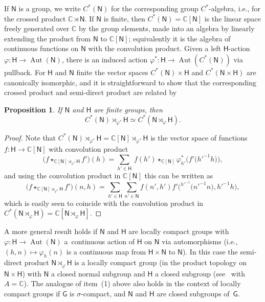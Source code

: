 \documentclass[11pt]{article}
\numberwithin{equation}{section}
\numberwithin{equation}{section}
\newcommand{\sfG}{\mathsf{G}}
\newcommand{\sfH}{\mathsf{H}}
\newcommand{\sfN}{\mathsf{N}}
\newcommand{\Aut}{\operatorname{Aut}}
\newcommand{\complex}{{\mathbb C}} %
\newtheorem{Proposition}[Theorem]{Proposition}
 { \theoremstyle{definition}
\newtheorem{Definition}[Theorem]{Definition}
\newtheorem{Note}[Theorem]{Note}
\newtheorem{Example}[Theorem]{Example}
\newtheorem{Remark}[Theorem]{Remark} }
\begin{document}
If $\sfN $ is a group, we write $C^*(\sfN )$ for the corresponding group
$C^*$-algebra, i.e., for the crossed product $\complex\rtimes \sfN $. If
$\sfN $ is finite, then $C^*(\sfN )=\complex[\sfN ]$ is the linear space
freely generated over $\complex$ by the group elements, made into an algebra by
linearly extending the product from $\sfN $ to $\complex[\sfN ]$; equivalently
it is the algebra of continuous functions
on $\sfN $ with the convolution product.
 Given a
left $\sfH $-action $\varphi\colon \sfH \to\Aut(\sfN )$, there is an induced action
$\varphi^*\colon \sfH \to \Aut(C^*(\sfN ))$ via pullback. For $\sfH $ and $\sfN $ finite the
vector spaces $ C^*(\sfN )\times \sfH $ and $C^*(\sfN \times \sfH )$ are canonically
isomorphic, and it is straightforward
to show that the corresponding crossed product and semi-direct product are
related by
\begin{Proposition}\label{cpsp}
If $\sfN$ and $\sfH$ are finite groups, then
\[
C^*(\sfN )\rtimes_{\varphi^*}\sfH \simeq C^*(\sfN \rtimes_\varphi \sfH ) .
\]
\end{Proposition}
\begin{proof} Note that $C^*(\sfN )\rtimes_{\varphi^*}\sfH =\complex[\sfN ]\rtimes_{\varphi^*}\sfH $ is the
 vector space of functions $f\colon \sfH \to \complex[\sfN ]$ with convolution product
\[
\big(f\star_{\complex[\sfN ]\rtimes_{\varphi^*}\sfH } f'\big)(h)=\sum_{h'\in
 \sfH }\,f(h')\star_{\complex[\sfN ]}\varphi^*_{h'}\big(f'\big(h'^{-1} h\big)\big) ,
\]
and using the convolution product in $\complex[\sfN]$ this can be
written as
\[
\big(f\star_{\complex[\sfN ]\rtimes_{\varphi^*}\sfH }
f'\big)(n,h)=\sum_{h'\in \sfH} \sum_{n'\in
 \sfN } f(n',h') f'\big({}^{h'^{-1\!}}\big(n'^{-1} n\big),h'^{-1} h\big) ,
\]
which is easily seen
 to coincide with the convolution product in $ C^*(\sfN \rtimes_\varphi \sfH )=\complex[\sfN \rtimes_\varphi \sfH ]$.
\end{proof}

A more general result holds if $\sfN $ and $\sfH $ are locally compact groups with $\varphi\colon \sfH \to \Aut (\sfN )$
a~continuous action of $\sfH $ on $\sfN $ via automorphisms
(i.e., $(h,n)\mapsto \varphi_h(n)$ is a continuous map from $\sfH \times \sfN $ to $\sfN $).
In this case the semi-direct product $\sfN \rtimes_\varphi \sfH $ is a locally compact
group (in the product topology on $\sfN \times \sfH $) with $\sfN $ a closed normal subgroup and $\sfH $ a closed
subgroup (see~\cite[Proposition~3.11]{Williams2007} with
$A=\complex$). The analogue of item~(1) above also holds in the
context of locally compact groups if $\sfG$ is $\sigma$-compact, and
$\sfN$ and $\sfH$ are closed subgroups of~$\sfG$.
\end{document}

